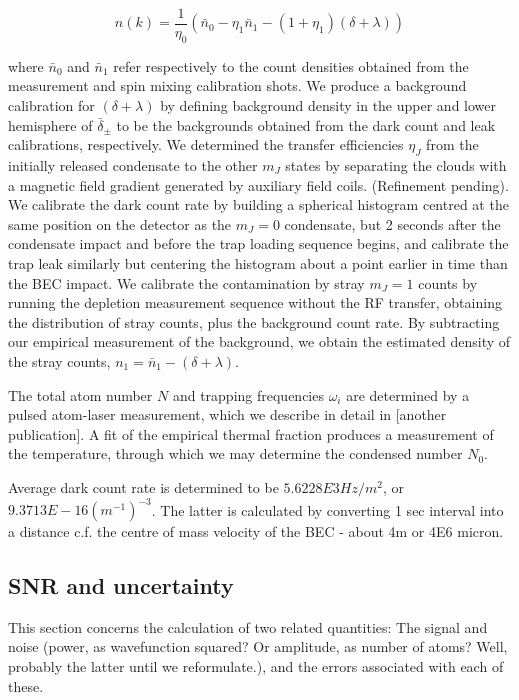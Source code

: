 \documentclass[%
 reprint,
 amsmath,amssymb,
 aps,
]{revtex4-1}
\begin{document}
\begin{equation}
    n(k) = \frac{1}{\eta_0}\left(\bar{n}_0 - \eta_1\bar{n}_1 - (1+\eta_1)(\delta+\lambda)\right)
\end{equation}

where $\bar{n}_0$ and $\bar{n}_1$ refer respectively to the count densities obtained from the measurement and spin mixing calibration shots. We produce a background calibration for $(\delta+\lambda)$ by defining background density in the upper and lower hemisphere of $\bar{\delta}_\pm$ to be the backgrounds obtained from the dark count and leak calibrations, respectively.
We determined the transfer efficiencies $\eta_J$ from the initially released condensate to the other $m_J$ states by separating the clouds with a magnetic field gradient generated by auxiliary field coils. (Refinement pending).
We calibrate the dark count rate by building a spherical histogram centred at the same position on the detector as the $m_J=0$ condensate, but 2 seconds after the condensate impact and before the trap loading sequence begins, and calibrate the trap leak similarly but centering the histogram about a point earlier in time than the BEC impact. 
We calibrate the contamination by stray $m_J=1$ counts by running the depletion measurement sequence without the RF transfer, obtaining the distribution of stray counts, plus the background count rate. 
By subtracting our empirical measurement of the background, we obtain the estimated density of the stray counts, $n_1 = \bar{n}_1 - (\delta+\lambda)$.

The total atom number $N$ and trapping frequencies $\omega_i$ are determined by a pulsed atom-laser measurement, which we describe in detail in [another publication]. 
A fit of the empirical thermal fraction produces a measurement of the temperature, through which we may determine the condensed number $N_0$.

Average dark count rate is determined to be $5.6228E3 Hz/m^2$, or $9.3713E-16 (m^{-1})^{-3}$. The latter is calculated by converting 1 sec interval into a distance c.f. the centre of mass velocity of the BEC - about 4m or 4E6 micron. 

\subsection{SNR and uncertainty}
This section concerns the calculation of two related quantities: The signal and noise (power, as wavefunction squared? Or amplitude, as number of atoms? Well, probably the latter until we reformulate.), and the errors associated with each of these. 
\end{document}
